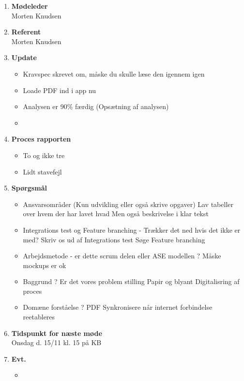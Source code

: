 	\begin{enumerate}
		\itemsep 0.3em 
		\item \textbf{Mødeleder}\\
			Morten Knudsen
		\item \textbf{Referent}\\
			Morten Knudsen

		\item \textbf{Update}
			\begin{itemize}[-]
				\item Kravspec skrevet om, måske du skulle læse den igennem igen
				\item Loade PDF ind i app nu
				\item Analysen er 90\% færdig (Opsætning af analysen)
				\item 
				
			\end{itemize}
	
		\item \textbf{Proces rapporten}
		\begin{itemize}[-]
			\item To og ikke tre
			\item Lidt stavefejl
			
		\end{itemize}
		
		\item \textbf{Spørgsmål}
			\begin{itemize}[-]
				\item Ansvarsområder (Kun udvikling eller også skrive opgaver)
				Lav tabeller over hvem der har lavet hvad
				Men også beskrivelse i klar tekst
				
				\item Integrations test og Feature branching - Trækker det ned hvis det ikke er med?
				Skriv os ud af Integrations test
				Søge Feature branching
				
				\item Arbejdsmetode - er dette scrum delen eller ASE modellen ?
				Måske mockups er ok
				
				\item Baggrund ? Er det vores problem stilling
				Papir og blyant
				Digitalisring af proces
				
				\item Domæne forståelse ?
				PDF
				Synkronisere når internet forbindelse reetableres
				
			\end{itemize}
	
		\item \textbf{Tidspunkt for næste møde} \\
			Onsdag d. 15/11 kl. 15 på KB
			
		\item \textbf{Evt.}
			\begin{itemize}[-]
				\item 
			\end{itemize}
			
	\end{enumerate}

